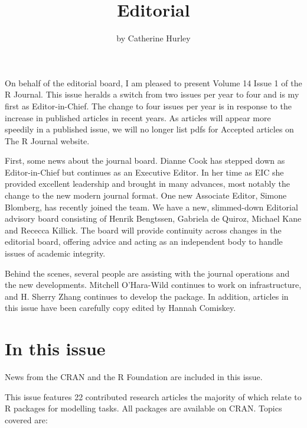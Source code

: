 \title{Editorial}
\author{by Catherine Hurley}

\maketitle


On behalf of the editorial board, I am pleased to present Volume 14
Issue 1 of the R Journal. This issue heralds a switch from two issues
per year to four and is my first as Editor-in-Chief. The change to four
issues per year is in response to the increase in published articles in
recent years. As articles will appear more speedily in a published
issue, we will no longer list pdfs for Accepted articles on The R
Journal website.

First, some news about the journal board. Dianne Cook has stepped down
as Editor-in-Chief but continues as an Executive Editor. In her time as
EIC she provided excellent leadership and brought in many advances, most
notably the change to the new modern journal format. One new Associate
Editor, Simone Blomberg, has recently joined the team. We have a new,
slimmed-down Editorial advisory board consisting of Henrik Bengtssen,
Gabriela de Quiroz, Michael Kane and Rececca Killick. The board will
provide continuity across changes in the editorial board, offering
advice and acting as an independent body to handle issues of academic
integrity.

Behind the scenes, several people are assisting with the journal
operations and the new developments. Mitchell O'Hara-Wild continues to
work on infrastructure, and H. Sherry Zhang continues to develop the
 package. In addition, articles in this issue have been
carefully copy edited by Hannah Comiskey.

\hypertarget{in-this-issue}{%
\section{In this issue}\label{in-this-issue}}

News from the CRAN and the R Foundation are included in this issue.

This issue features 22 contributed research articles the majority of
which relate to R packages for modelling tasks. All packages are
available on CRAN. Topics covered are:

